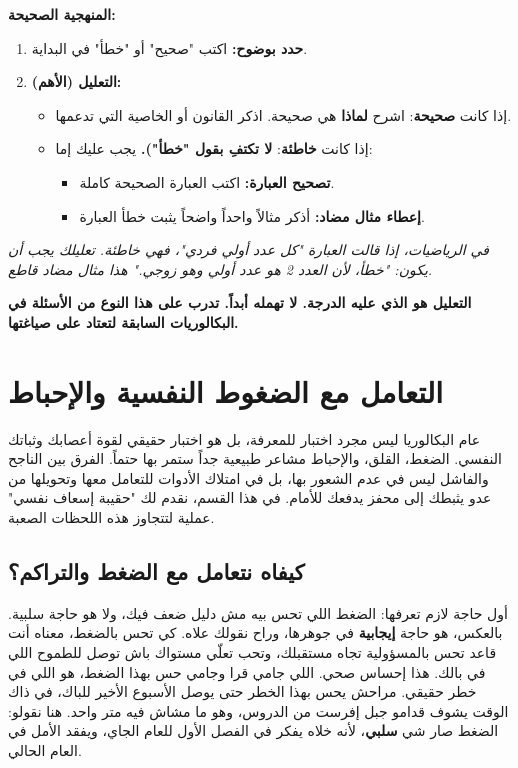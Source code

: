 \documentclass[12pt,a4paper]{book}
\newcommand{\quoteAr}[1]{%
	\begin{myquote}
		\itshape #1
	\end{myquote}
}
\newcommand{\importantAr}[1]{%
	\begin{important}
		\bfseries #1
	\end{important}
}
\begin{document}
	\textbf{المنهجية الصحيحة:}
	\begin{enumerate}
		\item \textbf{حدد بوضوح:} اكتب "صحيح" أو "خطأ" في البداية.
		\item \textbf{التعليل (الأهم):}
		\begin{itemize}
			\item إذا كانت \textbf{صحيحة}: اشرح \textbf{لماذا} هي صحيحة. اذكر القانون أو الخاصية التي تدعمها.
			\item إذا كانت \textbf{خاطئة}: \textbf{لا تكتفِ بقول "خطأ").} يجب عليك إما:
			\begin{itemize}
				\item \textbf{تصحيح العبارة:} اكتب العبارة الصحيحة كاملة.
				\item \textbf{إعطاء مثال مضاد:} أذكر مثالاً واحداً واضحاً يثبت خطأ العبارة.
			\end{itemize}
		\end{itemize}
	\end{enumerate}
	
	\quoteAr{في الرياضيات، إذا قالت العبارة "كل عدد أولي فردي"، فهي خاطئة. تعليلك يجب أن يكون: "خطأ، لأن العدد 2 هو عدد أولي وهو زوجي." هذا مثال مضاد قاطع.}
	
	\importantAr{التعليل هو الذي عليه الدرجة. لا تهمله أبداً. تدرب على هذا النوع من الأسئلة في البكالوريات السابقة لتعتاد على صياغتها.}
	
	\section{التعامل مع الضغوط النفسية والإحباط}
	
	عام البكالوريا ليس مجرد اختبار للمعرفة، بل هو اختبار حقيقي لقوة أعصابك وثباتك النفسي. الضغط، القلق، والإحباط مشاعر طبيعية جداً ستمر بها حتماً. الفرق بين الناجح والفاشل ليس في عدم الشعور بها، بل في امتلاك الأدوات للتعامل معها وتحويلها من عدو يثبطك إلى محفز يدفعك للأمام. في هذا القسم، نقدم لك "حقيبة إسعاف نفسي" عملية لتتجاوز هذه اللحظات الصعبة.
	
	\subsection{كيفاه نتعامل مع الضغط والتراكم؟}
	\label{sec:deal-with-stress}
	
	أول حاجة لازم تعرفها: الضغط اللي تحس بيه مش دليل ضعف فيك، ولا هو حاجة سلبية. بالعكس، هو حاجة \textbf{إيجابية} في جوهرها، وراح نقولك علاه. كي تحس بالضغط، معناه أنت قاعد تحس بالمسؤولية تجاه مستقبلك، وتحب تعلّي مستواك باش توصل للطموح اللي في بالك. هذا إحساس صحي. اللي جامي قرا وجامي حس بهذا الضغط، هو اللي في خطر حقيقي. مراحش يحس بهذا الخطر حتى يوصل الأسبوع الأخير للباك، في ذاك الوقت يشوف قدامو جبل إفرست من الدروس، وهو ما مشاش فيه متر واحد. هنا نقولو: الضغط صار شي \textbf{سلبي}، لأنه خلاه يفكر في الفصل الأول للعام الجاي، ويفقد الأمل في العام الحالي.
	
\end{document}
